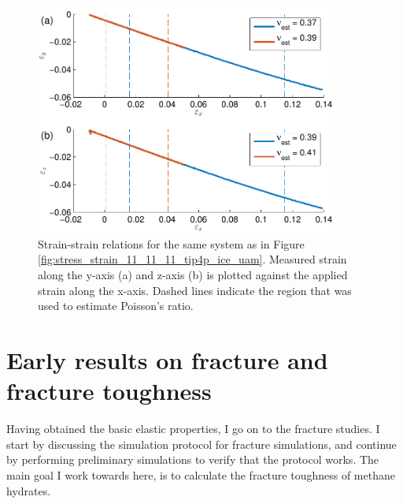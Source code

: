 \begin{figure}
\centering
\includegraphics[width=10cm]{../figures/thesis/strain_strain_11_11_11_y_z_poisson_tip4p_ice_uam.pdf}
\caption{Strain-strain relations for the same system as in Figure \ref{fig:stress_strain_11_11_11_tip4p_ice_uam}. Measured strain along the y-axis (a) and z-axis (b) is plotted against the applied strain along the x-axis. Dashed lines indicate the region that was used to estimate Poisson's ratio.}
\label{fig:strain_strain_11_11_11_y_z_poisson_tip4p_ice_uam}

\end{figure}

\section{Early results on fracture and fracture toughness}
Having obtained the basic elastic properties, I go on to the fracture studies. I start by discussing the simulation protocol for fracture simulations, and  continue by performing preliminary simulations to verify that the protocol works. The main goal I work towards here, is to calculate the fracture toughness of methane hydrates.
